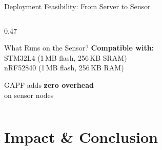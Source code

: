\documentclass[aspectratio=169, 11pt]{beamer}
\begin{document}
\begin{frame}{Deployment Feasibility: From Server to Sensor}
\begin{columns}[T]
\begin{column}{0.47\textwidth}
\begin{block}{What Runs on the Sensor?}
  \vspace{6pt}
  \normalsize
  \textbf{Compatible with:}\\[2pt]
  {\small STM32L4 (1\,MB flash, 256\,KB SRAM)\\
  nRF52840 (1\,MB flash, 256\,KB RAM)}
  \end{block}

  \vspace{4pt}
  \centering
  \colorbox{polyorange!15}{\parbox{0.95\columnwidth}{\centering\small
    GAPF adds \textbf{zero overhead}\\on sensor nodes
  }}

\end{column}
\end{columns}

\end{frame}


\section{Impact \& Conclusion}
\end{document}
